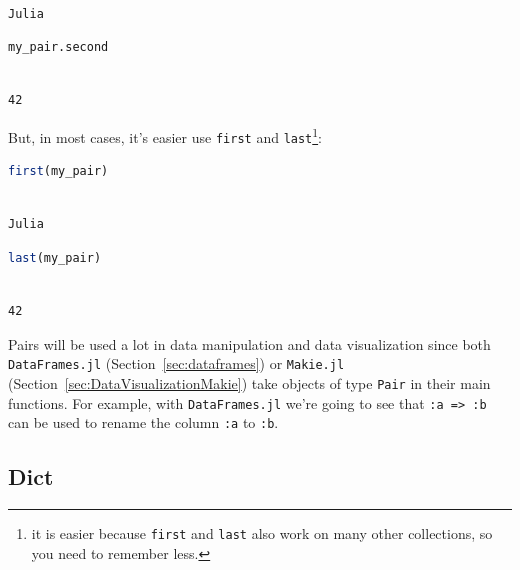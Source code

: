 \documentclass[
  notoc %
]{tufte-book}
\newcommand{\passthrough}[1]{#1}
\begin{document}
\begin{lstlisting}[language=Output]

Julia

\end{lstlisting}

\begin{lstlisting}[language=Julia]
my_pair.second
\end{lstlisting}

\begin{lstlisting}[language=Output]

42

\end{lstlisting}

But, in most cases, it's easier use \passthrough{\lstinline!first!} and
\passthrough{\lstinline!last!}\footnote{it is easier because
  \passthrough{\lstinline!first!} and \passthrough{\lstinline!last!}
  also work on many other collections, so you need to remember less.}:

\begin{lstlisting}[language=Julia]
first(my_pair)
\end{lstlisting}

\begin{lstlisting}[language=Output]

Julia

\end{lstlisting}

\begin{lstlisting}[language=Julia]
last(my_pair)
\end{lstlisting}

\begin{lstlisting}[language=Output]

42

\end{lstlisting}

Pairs will be used a lot in data manipulation and data visualization
since both \passthrough{\lstinline!DataFrames.jl!}
(Section~\ref{sec:dataframes}) or \passthrough{\lstinline!Makie.jl!}
(Section~\ref{sec:DataVisualizationMakie}) take objects of type
\passthrough{\lstinline!Pair!} in their main functions. For example,
with \passthrough{\lstinline!DataFrames.jl!} we're going to see that
\passthrough{\lstinline!:a => :b!} can be used to rename the column
\passthrough{\lstinline!:a!} to \passthrough{\lstinline!:b!}.

\hypertarget{sec:dict}{%
\subsection{Dict}\label{sec:dict}}
\end{document}
